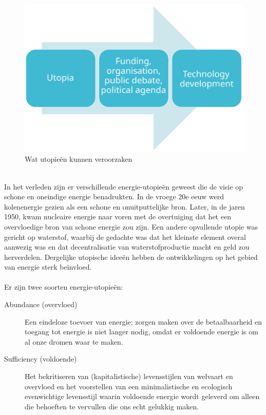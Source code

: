\documentclass[../summary.tex]{subfiles}
\begin{document}
	\begin{figure}[H]
		\centering
		\includegraphics[width=0.7\linewidth]{../images/wat-utopieen-doen}
		\caption{Wat utopieën kunnen veroorzaken}
		\label{fig:wat-utopieen-doen}
	\end{figure}
	\ \\
	In het verleden zijn er verschillende energie-utopieën geweest die de visie op schone en oneindige energie benadrukten. In de vroege 20e eeuw werd kolenenergie gezien als een schone en onuitputtelijke bron. Later, in de jaren 1950, kwam nucleaire energie naar voren met de overtuiging dat het een overvloedige bron van schone energie zou zijn. Een andere opvallende utopie was gericht op waterstof, waarbij de gedachte was dat het kleinste element overal aanwezig was en dat decentralisatie van waterstofproductie macht en geld zou herverdelen. Dergelijke utopische ideeën hebben de ontwikkelingen op het gebied van energie sterk beïnvloed.\\
	\\
	Er zijn twee soorten energie-utopieën:
	\begin{description}
		\item[Abundance (overvloed)] Een eindeloze toevoer van energie; zorgen maken over de betaalbaarheid en toegang tot energie is niet langer nodig, omdat er voldoende energie is om al onze dromen waar te maken.
		\item [Sufficiency (voldoende)] Het bekritiseren van (kapitalistische) levensstijlen van welvaart en overvloed en het voorstellen van een minimalistische en ecologisch evenwichtige levensstijl waarin voldoende energie wordt geleverd om alleen die behoeften te vervullen die ons echt gelukkig maken.
	\end{description}
	
\end{document}
